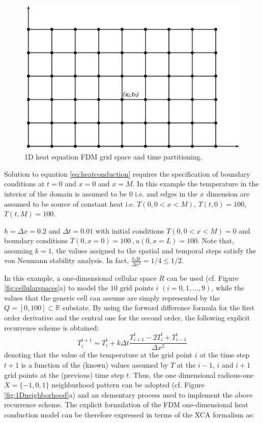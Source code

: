 \begin{figure}
\centering
\includegraphics[scale=0.3]{./images/CA_FDM/fdmgrid}
\caption{1D heat equation FDM grid space and time partitioning.}\label{torus}
\end{figure}

Solution to equation \ref{eq:heatconduction} requires the specification of boundary conditions at $t=0$ and $x=0$ and $x=M$.
In this example the temperature in the interior of the domain is assumed to be $0$ i.e. and edges in the $x$ dimension are assumed to be source of constant heat i.e. $T(0, 0<x<M)$,  $T(t,0)=100$, $T(t,M)=100$.
         
    $h = \Delta x = 0.2$ and $\Delta t = 0.01$ with initial
    conditions $T(0, 0 < x < M) = 0$ and boundary conditions $T(0,x=0)
    = 100 \: , u(0,x=L) =100$. Note that, assuming $k=1$, the values
    assigned to the spatial and temporal steps satisfy the von Neumann
    stability analysis. In fact, $\frac{k \Delta t}{\Delta x^2} = 1/4
    \leq 1/2$.
   
        In this example, a one-dimensional cellular space $R$
    can be used (cf. Figure \ref{fig:cellularspaces}a) to model the
    $10$ grid points $i$ $(i = 0, 1, ...,9)$, while the values that
    the generic cell can assume are simply represented by the $Q = [0,
      100] \subset \mathbb{R}$ substate. By using the forward
    difference formula for the first order derivative and the central
    one for the second order, the following explicit recurrence scheme
    is obtained:
    $$ T_i^{t+1} = T_i^t + k \Delta t \frac{T_{i+1}^t - 2T_i^t +
      T_{i-1}^t}{\Delta x^2}
    $$ denoting that the value of the temperature at the grid point
    $i$ at the time step $t+1$ is a function of the (known) values
    assumed by $T$ at the $i-1$, $i$ and $i+1$ grid points at the
    (previous) time step $t$. Thus, the one dimensional radious-one $X
    = \{-1, 0, 1\}$ neighburhood pattern can be adopted (cf. Figure
    \ref{fig:1Dneighborhood}a) and an elementary process used to
    implement the above recurrence scheme. The explicit formulation of
    the FDM one-dimensional heat conduction model can be therefore
    expressed in terms of the XCA formalism as:

